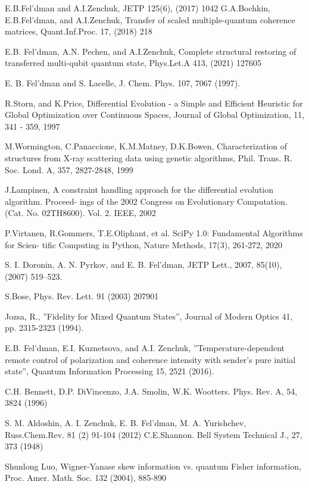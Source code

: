 \begin{thebibliography}{}
 E.B.Fel'dman and A.I.Zenchuk, JETP 125(6), (2017) 1042
 G.A.Bochkin, E.B.Fel’dman, and A.I.Zenchuk, Transfer of scaled multiple-quantum coherence matrices, Quant.Inf.Proc. 17, (2018) 218

 E.B. Fel'dman, A.N. Pechen, and A.I.Zenchuk, Complete structural restoring of transferred multi-qubit quantum state, Phys.Let.A 413, (2021) 127605

 E. B. Fel'dman and S. Lacelle, J. Chem. Phys. 107, 7067 (1997).

 R.Storn, and K.Price, Differential Evolution - a Simple and Efficient Heuristic for Global
Optimization over Continuous Spaces, Journal of Global Optimization, 11, 341 - 359, 1997

 M.Wormington, C.Panaccione, K.M.Matney, D.K.Bowen, Characterization of structures from
X-ray scattering data using genetic algorithms, Phil. Trans. R. Soc. Lond. A, 357, 2827-2848, 1999

 J.Lampinen, A constraint handling approach for the differential evolution algorithm. Proceed-
ings of the 2002 Congress on Evolutionary Computation. (Cat. No. 02TH8600). Vol. 2. IEEE, 2002

 P.Virtanen, R.Gommers, T.E.Oliphant, et al. SciPy 1.0: Fundamental Algorithms for Scien-
tific Computing in Python, Nature Methods, 17(3), 261-272, 2020

 S. I. Doronin, A. N. Pyrkov, and E. B. Fel'dman, JETP Lett., 2007, 85(10), (2007) 519–523.

 S.Bose, Phys. Rev. Lett. 91 (2003) 207901

 Jozsa, R., ”Fidelity for Mixed Quantum States”, Journal of Modern Optics 41, pp. 2315-2323 (1994).

 E.B. Fel'dman, E.I. Kuznetsova, and A.I. Zenchuk, ”Temperature-dependent remote control of polarization and coherence intensity with sender’s pure initial state”, Quantum Information Processing 15, 2521 (2016).

 C.H. Bennett, D.P. DiVincenzo, J.A. Smolin, W.K. Wootters.
Phys. Rev. A, 54, 3824 (1996)

  S. M. Aldoshin, A. I. Zenchuk, E. B. Fel'dman, M. A. Yurishchev, Russ.Chem.Rev. 81 (2) 91-104 (2012)
 C.E.Shannon. Bell System Technical J., 27, 373 (1948)

 Shunlong Luo, Wigner-Yanase skew information vs. quantum Fisher information, Proc. Amer. Math. Soc. 132 (2004), 885-890

\end{thebibliography}
